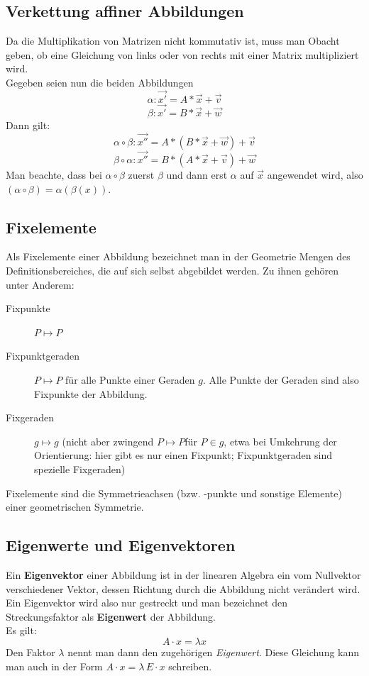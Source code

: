 \documentclass[a4paper,10pt,DIV9, BCOR12mm, oneside,openright,openbib]{scrreprt}
\theoremstyle{definition}
\theoremstyle{plain}
\begin{document}
\subsection{Verkettung affiner Abbildungen}
Da die Multiplikation von Matrizen nicht kommutativ ist, muss man Obacht geben, ob eine Gleichung
von links oder von rechts mit einer Matrix multipliziert wird. \\
Gegeben seien nun die beiden Abbildungen
\[ \alpha \colon \overrightarrow{x'} = A * \overrightarrow{x} + \overrightarrow{v} \]
\[ \beta \colon \overrightarrow{x'} = B * \overrightarrow{x} + \overrightarrow{w} \]
Dann gilt:
\[ \alpha \circ \beta \colon \overrightarrow{x''} = A * (B * \overrightarrow{x} + \overrightarrow{w}) + \overrightarrow{v}\]
\[ \beta \circ \alpha \colon \overrightarrow{x''} = B * (A * \overrightarrow{x} + \overrightarrow{v}) + \overrightarrow{w}\]
Man beachte, dass bei $\alpha \circ \beta $ zuerst $\beta$ und dann erst $\alpha$ auf $\overrightarrow{x}$ angewendet wird, also $(\alpha \circ \beta) = \alpha(\beta(x))$.

\subsection{Fixelemente}
Als Fixelemente einer Abbildung bezeichnet man in der Geometrie Mengen des Definitionsbereiches, die auf sich selbst abgebildet werden. Zu ihnen gehören unter Anderem:

\begin{description}
 \item[Fixpunkte] $P \mapsto P$
 \item[Fixpunktgeraden] $P \mapsto P$ für alle Punkte einer Geraden $g$. Alle Punkte der Geraden sind also Fixpunkte der Abbildung.
 \item[Fixgeraden] $g \mapsto g$ (nicht aber zwingend $P \mapsto P $für $P \in g$, etwa bei Umkehrung der Orientierung: hier gibt es nur einen Fixpunkt; Fixpunktgeraden sind spezielle Fixgeraden)
\end{description}
 Fixelemente sind die Symmetrieachsen (bzw. -punkte und sonstige Elemente) einer geometrischen Symmetrie.
 
\subsection{Eigenwerte und Eigenvektoren}
Ein \textbf{Eigenvektor} einer Abbildung ist in der linearen Algebra ein vom Nullvektor verschiedener Vektor, dessen Richtung durch die Abbildung nicht verändert wird. Ein Eigenvektor wird also nur gestreckt und man bezeichnet den Streckungsfaktor als \textbf{Eigenwert} der Abbildung.\\
Es gilt: \[ A \cdot x = \lambda x  \]
Den Faktor $\lambda$ nennt man dann den zugehörigen \textit{Eigenwert}. Diese Gleichung kann man auch in der Form $A \cdot x = \lambda \,E \cdot x$ schreiben.
\end{document}
